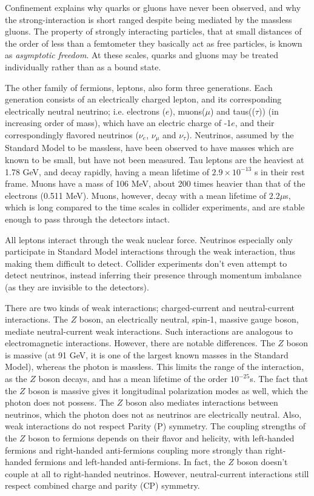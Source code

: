 \documentclass[11pt,a4paper,openright,twoside]{report}
\begin{document}
Confinement explains why quarks or gluons have never been observed, and why the strong-interaction is short ranged despite being mediated by the massless gluons. The property of strongly interacting particles, that at small distances of the order of less than a femtometer they basically act as free particles, is known as \textit{asymptotic freedom}. At these scales, quarks and gluons may be treated individually rather than as a bound state. 

The other family of fermions, leptons, also form three generations. Each generation consists of an electrically charged lepton, and its corresponding electrically neutral neutrino; i.e. electrons ($e$), muons($\mu$) and taus(($\tau$)) (in increasing order of mass), which have an electric charge of -1$e$, and their correspondingly flavored neutrinos ($\nu_e$, $\nu_{\mu}$ and $\nu_{\tau}$). Neutrinos, assumed by the Standard Model to be massless, have been observed to have masses \cite{nu1,nu2,nu3} which are known to be small, but have not been measured. Tau leptons are the heaviest at 1.78 GeV, and decay rapidly, having a mean lifetime of $2.9\times 10^{-13}$ s in their rest frame. Muons have a mass of 106 MeV, about 200 times heavier than that of the electrons (0.511 MeV). Muons, however, decay with a mean lifetime of $2.2 \mu$s, which is long compared to the time scales in collider experiments, and are stable enough to pass through the detectors intact.

All leptons interact through the weak nuclear force. Neutrinos especially only participate in Standard Model interactions through the weak interaction, thus making them difficult to detect. Collider experiments don't even attempt to detect neutrinos, instead inferring their presence through momentum imbalance (as they are invisible to the detectors). 

There are two kinds of weak interactions; charged-current and neutral-current interactions. The $Z$ boson, an electrically neutral, spin-1, massive gauge boson, mediate neutral-current weak interactions. Such interactions are analogous to electromagnetic interactions. However, there are notable differences. The $Z$ boson is massive (at 91 GeV, it is one of the largest known masses in the Standard Model), whereas the photon is massless. This limits the range of the interaction, as the $Z$ boson decays, and has a mean lifetime of the order $10^{-25}$s. The fact that the $Z$ boson is massive gives it longitudinal polarization modes\cite{quarks_and_leptons} as well, which the photon does not possess. The $Z$ boson also mediates interactions between neutrinos, which the photon does not as neutrinos are electrically neutral. Also, weak interactions do not respect Parity (P) symmetry. The coupling strengths of the $Z$ boson to fermions depends on their flavor and helicity, with left-handed fermions and right-handed anti-fermions coupling more strongly than right-handed fermions and left-handed anti-fermions. In fact, the $Z$ boson doesn't couple at all to right-handed neutrinos. However, neutral-current interactions still respect combined charge and parity (CP) symmetry.
\end{document}
